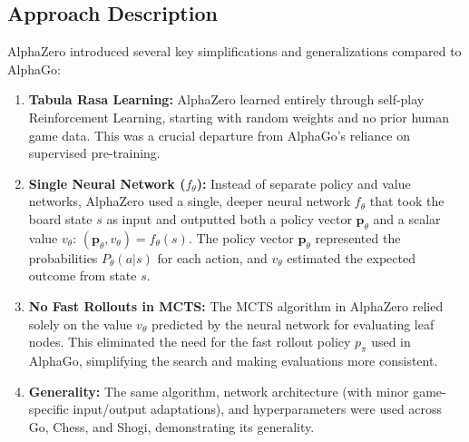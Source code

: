 \documentclass[11pt,a4paper]{article}
\begin{document}
\subsection{Approach Description}
AlphaZero introduced several key simplifications and generalizations compared to AlphaGo:
\begin{enumerate}
    \item \textbf{Tabula Rasa Learning:} AlphaZero learned entirely through self-play Reinforcement Learning, starting with random weights and no prior human game data. This was a crucial departure from AlphaGo's reliance on supervised pre-training.
    \item \textbf{Single Neural Network ($f_{\theta}$):} Instead of separate policy and value networks, AlphaZero used a single, deeper neural network $f_{\theta}$ that took the board state $s$ as input and outputted both a policy vector $\mathbf{p}_{\theta}$ and a scalar value $v_{\theta}$: $(\mathbf{p}_{\theta}, v_{\theta}) = f_{\theta}(s)$. The policy vector $\mathbf{p}_{\theta}$ represented the probabilities $P_{\theta}(a|s)$ for each action, and $v_{\theta}$ estimated the expected outcome from state $s$.
    \item \textbf{No Fast Rollouts in MCTS:} The MCTS algorithm in AlphaZero relied solely on the value $v_{\theta}$ predicted by the neural network for evaluating leaf nodes. This eliminated the need for the fast rollout policy $p_{\pi}$ used in AlphaGo, simplifying the search and making evaluations more consistent.
    \item \textbf{Generality:} The same algorithm, network architecture (with minor game-specific input/output adaptations), and hyperparameters were used across Go, Chess, and Shogi, demonstrating its generality.
\end{enumerate}
\end{document}
